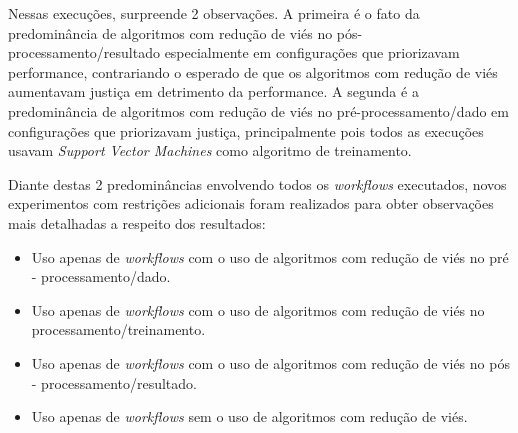 \documentclass[portugues]{ic-tese}
\begin{document}
\begin{table}[H]
\begin{center}
  \caption{Melhores opções escolhidas pelo modelo MAPE-K \\ Todos os métodos - 25\% Performance/75\% Fairness}
\label{tbl:ScoreMAPEKGeral2575}
\end{center}
\end{table}

Nessas execuções, surpreende 2 observações. A primeira é o fato da predominância de algoritmos com redução de viés no pós-processamento/resultado especialmente em configurações que priorizavam performance, contrariando o esperado de que os algoritmos com redução de viés aumentavam justiça em detrimento da performance. A segunda é a predominância de algoritmos com redução de viés no pré-processamento/dado em configurações que priorizavam justiça, principalmente pois todos as execuções usavam \textit{Support Vector Machines} como algoritmo de treinamento.

Diante destas 2 predominâncias envolvendo todos os \textit{workflows} executados, novos experimentos com restrições adicionais foram realizados para obter observações mais detalhadas a respeito dos resultados:

\begin{itemize}
\item Uso apenas de \textit{workflows} com o uso de algoritmos com redução de viés no pré - processamento/dado.
\item Uso apenas de \textit{workflows} com o uso de algoritmos com redução de viés no processamento/treinamento.
\item Uso apenas de \textit{workflows} com o uso de algoritmos com redução de viés no pós - processamento/resultado.
\item Uso apenas de \textit{workflows} sem o uso de algoritmos com redução de viés.
\end{itemize}
\end{document}
